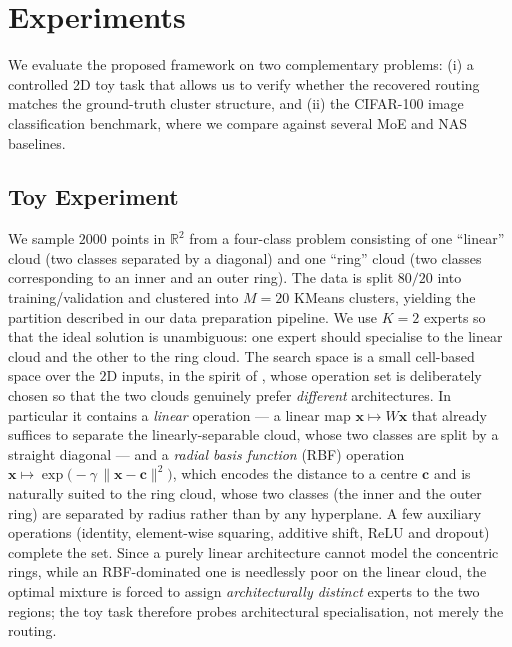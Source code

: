 \section{Experiments}
\label{sec:experiments}

We evaluate the proposed framework on two complementary problems:
(i) a controlled 2D toy task that allows us to verify whether the
recovered routing matches the ground-truth cluster structure, and
(ii) the CIFAR-100 image classification benchmark, where we compare
against several MoE and NAS baselines.

\subsection{Toy Experiment}
\label{subsec:toy}

We sample $2000$ points in $\mathbb{R}^2$ from a four-class problem
consisting of one ``linear'' cloud (two classes separated by a
diagonal) and one ``ring'' cloud (two classes corresponding to an
inner and an outer ring). The data is split $80/20$ into
training/validation and clustered into $M = 20$ KMeans clusters,
yielding the partition described in our data preparation pipeline.
We use $K = 2$ experts so that the ideal solution is unambiguous: one
expert should specialise to the linear cloud and the other to the
ring cloud. The search space is a small cell-based space over the
$2$D inputs, in the spirit of \cite{liu2018darts}, whose operation set
is deliberately chosen so that the two clouds genuinely prefer
\emph{different} architectures. In particular it contains a
\emph{linear} operation --- a linear map
$\boldsymbol{x}\mapsto W\boldsymbol{x}$ that already suffices to
separate the linearly-separable cloud, whose two classes are split by a
straight diagonal --- and a \emph{radial basis function} (RBF)
operation
$\boldsymbol{x}\mapsto \exp\!\bigl(-\gamma\,\lVert\boldsymbol{x}-\boldsymbol{c}\rVert^2\bigr)$,
which encodes the distance to a centre $\boldsymbol{c}$ and is naturally
suited to the ring cloud, whose two classes (the inner and the outer
ring) are separated by radius rather than by any hyperplane. A few
auxiliary operations (identity, element-wise squaring, additive shift,
$\mathrm{ReLU}$ and dropout) complete the set. Since a purely linear
architecture cannot model the concentric rings, while an RBF-dominated
one is needlessly poor on the linear cloud, the optimal mixture is
forced to assign \emph{architecturally distinct} experts to the two
regions; the toy task therefore probes architectural specialisation,
not merely the routing.

